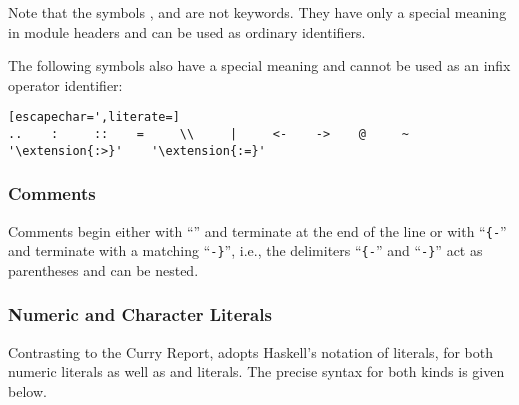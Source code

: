 Note that the symbols , 
and  are not keywords.
They have only a special meaning in module headers
and can be used as ordinary identifiers.

The following symbols also have a special meaning and cannot
be used as an infix operator identifier:
\begin{lstlisting}[escapechar=',literate=]
..    :     ::    =     \\     |     <-    ->    @     ~     '\extension{:>}'    '\extension{:=}'
\end{lstlisting}

\subsubsection{Comments}

Comments begin either with ``\term{--}'' and terminate at the end of the line
or with ``\verb|{-|'' and terminate with a matching ``\verb|-}|'', i.e.,
the delimiters ``\verb|{-|'' and ``\verb|-}|''
act as parentheses and can be nested.

\subsubsection{Numeric and Character Literals}

Contrasting to the Curry Report, \CYS adopts Haskell's notation of literals,
for both numeric literals as well as  and  literals.
The precise syntax for both kinds is given below.

